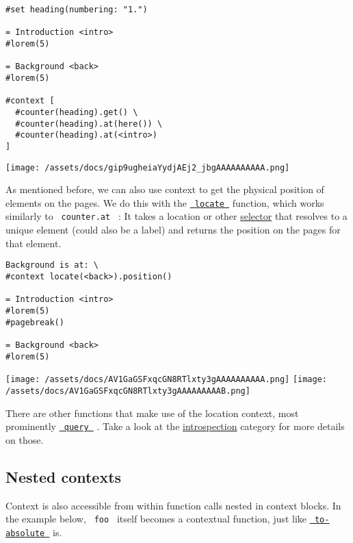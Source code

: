 \begin{verbatim}
#set heading(numbering: "1.")

= Introduction <intro>
#lorem(5)

= Background <back>
#lorem(5)

#context [
  #counter(heading).get() \
  #counter(heading).at(here()) \
  #counter(heading).at(<intro>)
]
\end{verbatim}

\texttt{[image: /assets/docs/gip9ugheiaYydjAEj2\_jbgAAAAAAAAAA.png]}

As mentioned before, we can also use context to get the physical
position of elements on the pages. We do this with the
\href{/docs/reference/introspection/locate/}{\texttt{\ locate\ }}
function, which works similarly to \texttt{\ counter.at\ } : It takes a
location or other \href{/docs/reference/foundations/selector/}{selector}
that resolves to a unique element (could also be a label) and returns
the position on the pages for that element.

\begin{verbatim}
Background is at: \
#context locate(<back>).position()

= Introduction <intro>
#lorem(5)
#pagebreak()

= Background <back>
#lorem(5)
\end{verbatim}

\texttt{[image: /assets/docs/AV1GaGSFxqcGN8RTlxty3gAAAAAAAAAA.png]}
\texttt{[image: /assets/docs/AV1GaGSFxqcGN8RTlxty3gAAAAAAAAAB.png]}

There are other functions that make use of the location context, most
prominently
\href{/docs/reference/introspection/query/}{\texttt{\ query\ }} . Take a
look at the \href{/docs/reference/introspection/}{introspection}
category for more details on those.

\subsection{Nested contexts}\label{nested-contexts}

Context is also accessible from within function calls nested in context
blocks. In the example below, \texttt{\ foo\ } itself becomes a
contextual function, just like
\href{/docs/reference/layout/length/\#definitions-to-absolute}{\texttt{\ to-absolute\ }}
is.

